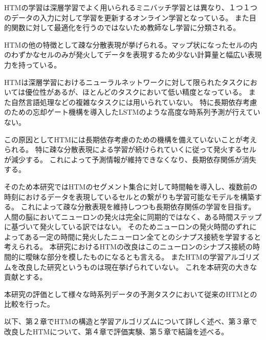 HTMの学習は深層学習でよく用いられるミニバッチ学習とは異なり、１つ１つのデータの入力に対して学習を更新するオンライン学習となっている。
また目的関数に対して最適化を行うのではないため教師なし学習に分類される。

HTMの他の特徴として疎な分散表現が挙げられる。マップ状になったセルの内のわずかなセルのみが発火してデータを表現するため少ない計算量と幅広い表現力を持っている。

HTMは深層学習におけるニューラルネットワークに対して限られたタスクにおいては優位性があるが、ほとんどのタスクにおいて低い精度となっている。
また自然言語処理などの複雑なタスクには用いられていない。
特に長期依存考慮のための忘却ゲート機構を導入したLSTM\cite{lstm_forget_gate}のような高度な時系列予測が行えていない。

この原因としてHTMには長期依存考慮のための機構を備えていないことが考えられる。
特に疎な分散表現による学習が続けられていくに従って発火するセルが減少する。
これによって予測情報が維持できなくなり、長期依存関係が消失する。

そのため本研究ではHTMのセグメント集合に対して時間軸を導入し、複数前の時刻におけるデータを表現しているセルとの繋がりも学習可能なモデルを構築する。
これによって疎な分散表現を維持しつつも長期依存関係の学習を目指す。
人間の脳においてニューロンの発火は完全に同期的ではなく、ある時間ステップに基づいて発火している訳ではない。
そのためニューロンの発火時間のずれによってある一定の時間に発火したニューロン全てとのシナプス接続を学習すると考えられる。
本研究におけるHTMの改良はこのニューロンのシナプス接続の時間的に曖昧な部分を模したものになるとも言える。
またHTMの学習アルゴリズムを改良した研究というものは現在挙げられていない。
これを本研究の大きな貢献とする。

本研究の評価として様々な時系列データの予測タスクにおいて従来のHTMとの比較を行った。

以下、第２章でHTMの構造と学習アルゴリズムについて詳しく述べ、第３章で改良したHTMについて、第４章で評価実験、第５章で結論を述べる。
